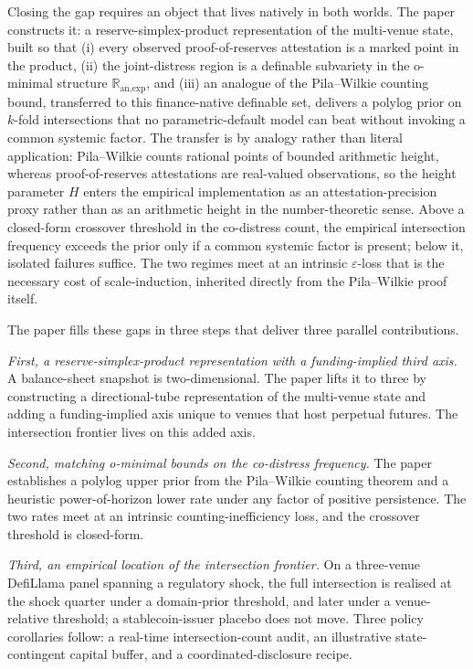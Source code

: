 \documentclass[12pt]{article}
\theoremstyle{sampledef}
\theoremstyle{sampleplain}
\theoremstyle{sampleremark}
\newcommand{\R}{\mathbb{R}}
\newcommand{\1}{\mathbf{1}}
\begin{document}
Closing the gap requires an object that lives natively in both worlds.
The paper constructs it: a reserve-simplex-product representation of
the multi-venue state, built so that (i) every observed proof-of-reserves
attestation is a marked point in the product, (ii) the joint-distress
region is a definable subvariety in the o-minimal structure
$\R_{\text{an,exp}}$, and (iii) an analogue of the Pila--Wilkie counting
bound, transferred to this finance-native definable set,
delivers a polylog prior on $k$-fold intersections that no
parametric-default model can beat without invoking a common systemic
factor. The transfer is by analogy rather than literal application:
Pila--Wilkie counts rational points of bounded arithmetic height,
whereas proof-of-reserves attestations are real-valued observations,
so the height parameter $H$ enters the empirical implementation as an
attestation-precision proxy rather than as an arithmetic height in
the number-theoretic sense. Above a closed-form crossover threshold in
the co-distress count, the empirical intersection frequency exceeds
the prior only if a common systemic factor is present; below it,
isolated failures suffice. The two regimes meet at an intrinsic
$\varepsilon$-loss that is the necessary cost of scale-induction,
inherited directly from the Pila--Wilkie proof itself.

The paper fills these gaps in three steps that deliver three parallel
contributions.

\emph{First, a reserve-simplex-product representation with a
funding-implied third axis.} A balance-sheet snapshot is
two-dimensional. The paper lifts it to three by constructing a
directional-tube representation of the multi-venue state and
adding a funding-implied axis unique to venues that host perpetual
futures. The intersection frontier lives on this added axis.

\emph{Second, matching o-minimal bounds on the co-distress
frequency.} The paper establishes a polylog upper prior from the
Pila--Wilkie counting theorem and a heuristic power-of-horizon
lower rate under any factor of positive persistence. The two
rates meet at an intrinsic counting-inefficiency loss, and the
crossover threshold is closed-form.

\emph{Third, an empirical location of the intersection frontier.}
On a three-venue DefiLlama panel spanning a regulatory shock, the
full intersection is realised at the shock quarter under a
domain-prior threshold, and later under a venue-relative
threshold; a stablecoin-issuer placebo does not move. Three
policy corollaries follow: a real-time intersection-count audit,
an illustrative state-contingent capital buffer, and a
coordinated-disclosure recipe.
\end{document}
